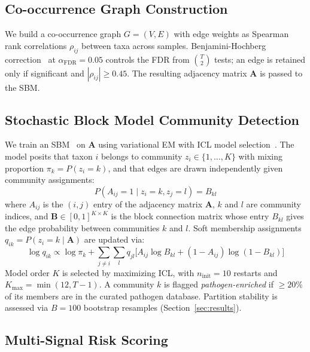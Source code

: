\documentclass[conference]{IEEEtran}
\begin{document}
\subsection{Co-occurrence Graph Construction}

We build a co-occurrence graph $G = (V, E)$ with edge weights as Spearman
rank correlations $\rho_{ij}$ between taxa across samples.
Benjamini-Hochberg correction~\cite{Benjamini1995} at $\alpha_{\text{FDR}}=0.05$
controls the FDR from $\binom{T}{2}$ tests; an edge is retained only if
significant and $|\rho_{ij}| \geq 0.45$. The resulting adjacency matrix
$\mathbf{A}$ is passed to the SBM.

\subsection{Stochastic Block Model Community Detection}

We train an SBM~\cite{Holland1983,Karrer2011} on $\mathbf{A}$ using
variational EM with ICL model selection~\cite{Peixoto2014}.
The model posits that taxon $i$ belongs to community
$z_i \in \{1,\ldots,K\}$ with mixing proportion $\pi_k = P(z_i=k)$,
and that edges are drawn independently given community assignments:
%
\begin{equation}
P(A_{ij} = 1 \mid z_i = k, z_j = l) = B_{kl}
\end{equation}
%
where $A_{ij}$ is the $(i,j)$ entry of the adjacency matrix $\mathbf{A}$,
$k$ and $l$ are community indices, and
$\mathbf{B} \in [0,1]^{K \times K}$ is the block connection matrix
whose entry $B_{kl}$ gives the edge probability between communities
$k$ and $l$. Soft membership assignments
$q_{ik} = P(z_i = k \mid \mathbf{A})$ are updated via:
%
\begin{equation}
\log q_{ik} \!\propto\! \log \pi_k + \!\sum_{j \neq i}\! \sum_l q_{jl}
  \big[ A_{ij} \log B_{kl} + (1 \!-\! A_{ij}) \log(1 \!-\! B_{kl}) \big]
\end{equation}
%
Model order $K$ is selected by maximizing ICL, with $n_{\text{init}}=10$
restarts and $K_{\max}=\min(12, T-1)$.
A community $k$ is flagged \emph{pathogen-enriched} if $\geq 20\%$ of
its members are in the curated pathogen database.
Partition stability is assessed via $B=100$ bootstrap resamples
(Section~\ref{sec:results}).

\subsection{Multi-Signal Risk Scoring}
\label{sec:recalibration}
\end{document}
